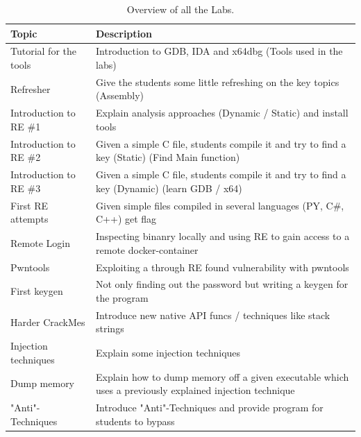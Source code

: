 \begin{center}
    \begin{table}[H]
        \centering
        \begin{tabular}{ |p{4.1cm}|p{10cm}| } 
            \hline
                Topic & 
                Description \\ [0.5ex] 
            \hline
            \hline
                Tutorial for the tools & Introduction to GDB, IDA and x64dbg (Tools used in the labs) \\
            \hline
                Refresher & 
                Give the students some little refreshing on the key topics (Assembly)  \\ 
            \hline
                Introduction to RE \#1 & 
                Explain analysis approaches (Dynamic / Static) and install tools \\ 
            \hline
                Introduction to RE \#2 & 
                Given a simple C file, students compile it and try to find a key (Static) (Find Main function) \\ 
            \hline
                Introduction to RE \#3 & 
                Given a simple C file, students compile it and try to find a key (Dynamic) (learn GDB / x64) \\ 
            \hline
                First RE attempts & 
                Given simple files compiled in several languages (PY, C\#, C++) get flag \\ 
            \hline
                Remote Login  & 
                Inspecting binanry locally and using RE to gain access to a remote docker-container \\
            \hline
                Pwntools & 
                Exploiting a through RE found vulnerability with pwntools \\
            \hline
                First keygen & 
                Not only finding out the password but writing a keygen for the program \\
            \hline
                Harder CrackMes & 
                Introduce new native API funcs / techniques like stack strings \\
            \hline
                Injection techniques & 
                Explain some injection techniques \\
            \hline
                Dump memory & 
                Explain how to dump memory off a given executable which uses a previously explained injection technique \\
            \hline
                "Anti"-Techniques & 
                Introduce "Anti"-Techniques and provide program for students to bypass \\
            \hline
        \end{tabular}
        \caption{Overview of all the Labs.}
    \end{table}
\end{center}
